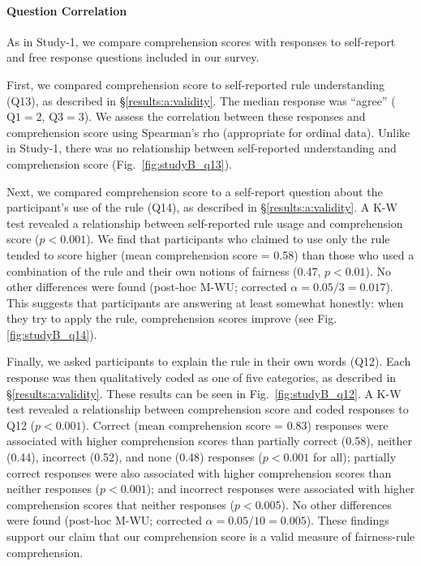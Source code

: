 \documentclass{article}
\newcommand{\studyA}{Study-1}
\begin{document}
\paragraph{Question Correlation} \label{qcorr}

As in \studyA{}, we compare comprehension scores with responses to self-report and free response questions included in our survey.

First, we compared comprehension score to self-reported rule understanding (Q13), as described in \S\ref{results:a:validity}.
The median response was ``agree'' ($\text{Q1}=2$, $\text{Q3}=3$). We assess the correlation between these responses and comprehension score using Spearman's rho (appropriate for ordinal data). Unlike in \studyA{}, there was no relationship between self-reported understanding and comprehension score (Fig.~\ref{fig:studyB_q13}).


Next, we compared comprehension score to a self-report question about the participant's use of the rule (Q14), as described in \S\ref{results:a:validity}.
A K-W test revealed a relationship between self-reported rule usage and comprehension score ($p<0.001$). We find that participants who claimed to use only the rule tended to score higher (mean comprehension score = 0.58) than those who used a combination of the rule and their own notions of fairness (0.47, $p<0.01$). No other differences were found (post-hoc M-WU;  corrected $\alpha = 0.05/3 = 0.017$). This suggests that participants are answering at least somewhat honestly: when they try to apply the rule, comprehension scores improve (see Fig. \ref{fig:studyB_q14}).




Finally, we asked participants to explain the rule in their own words (Q12). Each response was then qualitatively coded as one of five categories, as described in \S\ref{results:a:validity}.
These results can be seen in Fig.~\ref{fig:studyB_q12}. A K-W test revealed a relationship between comprehension score and coded responses to Q12 ($p<0.001$). Correct (mean comprehension score = 0.83) responses were associated with higher comprehension scores than partially correct (0.58), neither (0.44), incorrect (0.52), and none (0.48) responses ($p<0.001$ for all); partially correct responses were also associated with higher comprehension scores than neither responses 
($p<0.001$); and incorrect responses were associated with higher comprehension scores that neither responses 
($p<0.005$). No other differences were found (post-hoc M-WU; corrected $\alpha = 0.05/10 = 0.005$). These findings support our claim that our comprehension score is a valid measure of fairness-rule comprehension.
\end{document}
